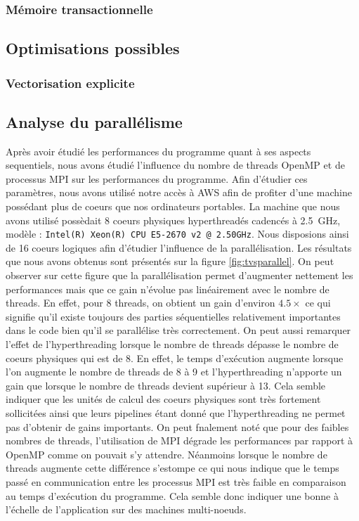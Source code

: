 \documentclass[11pt,a4paper]{article}
\begin{document}
			\subsubsection{Mémoire transactionnelle}

		\subsection{Optimisations possibles}
			\subsubsection{Vectorisation explicite}

	\subsection{Analyse du parallélisme}
		Après avoir étudié les performances du programme quant à ses aspects sequentiels, nous avons étudié l'influence du nombre de threads OpenMP et de processus MPI sur les performances du programme. Afin d'étudier ces paramètres, nous avons utilisé notre accès à AWS afin de profiter d'une machine possédant plus de coeurs que nos ordinateurs portables. La machine que nous avons utilisé possèdait 8 coeurs physiques hyperthreadés cadencés à \SI{2.5}{\giga\hertz}, modèle : \texttt{Intel(R) Xeon(R) CPU E5-2670 v2 @ 2.50GHz}. Nous disposions ainsi de 16 coeurs logiques afin d'étudier l'influence de la parallélisation. Les résultats que nous avons obtenus sont présentés sur la figure \ref{fig:tvsparallel}. On peut observer sur cette figure que la parallélisation permet d'augmenter nettement les performances mais que ce gain n'évolue pas linéairement avec le nombre de threads. En effet, pour 8 threads, on obtient un gain d'environ $4.5\times$ ce qui signifie qu'il existe toujours des parties séquentielles relativement importantes dans le code bien qu'il se parallélise très correctement. On peut aussi remarquer l'effet de l'hyperthreading lorsque le nombre de threads dépasse le nombre de coeurs physiques qui est de 8. En effet, le temps d'exécution augmente lorsque l'on augmente le nombre de threads de 8 à 9 et l'hyperthreading n'apporte un gain que lorsque le nombre de threads devient supérieur à 13. Cela semble indiquer que les unités de calcul des coeurs physiques sont très fortement sollicitées ainsi que leurs pipelines étant donné que l'hyperthreading ne permet pas d'obtenir de gains importants. On peut fnalement noté que pour des faibles nombres de threads, l'utilisation de MPI dégrade les performances par rapport à OpenMP comme on pouvait s'y attendre. Néanmoins lorsque le nombre de threads augmente cette différence s'estompe ce qui nous indique que le temps passé en communication entre les processus MPI est très faible en comparaison au temps d'exécution du programme. Cela semble donc indiquer une bonne à l'échelle de l'application sur des machines multi-noeuds.
\end{document}
